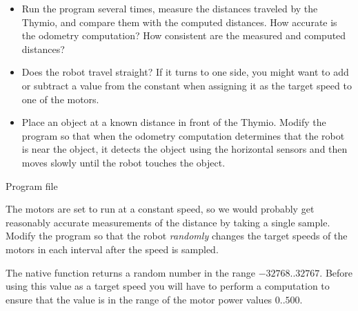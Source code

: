 \begin{itemize}
\item Run the program several times, measure the distances traveled by the Thymio,
and compare them with the computed distances. How accurate is the odometry
computation? How consistent are the measured and computed distances?

\item Does the robot travel straight? If it turns to one side, you might want to
add or subtract a value from the constant  when assigning it as
the target speed to one of the motors.

\item Place an object at a known distance in front of the Thymio.
Modify the program so that when the odometry computation determines
that the robot is near the object, it detects the object using
the horizontal sensors and then moves slowly until the robot touches the object.

\end{itemize}


{\raggedleft \hfill Program file }

The motors are set to run at a constant speed,
so we would probably get reasonably accurate measurements of the distance
by taking a single sample.
Modify the program so that the robot \emph{randomly} changes the target speeds
of the motors in each interval after the speed is sampled.

The native function  returns a random
number in the range $-32768 .. 32767$. Before using this value as a target
speed you will have to perform a computation to ensure that the value is in
the range of the motor power values $0 .. 500$.
